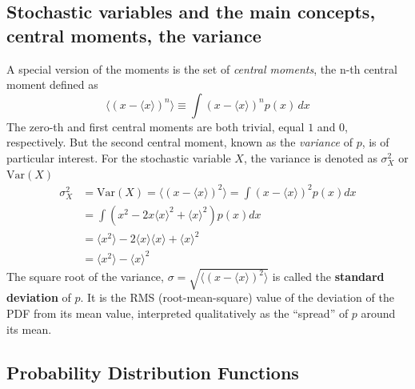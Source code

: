 \documentclass[%
oneside,                 %
final,                   %
10pt]{article}
\newenvironment{block_mdfboxadmon}[1][]{
\begin{block_mdfboxmdframed}[frametitle=#1]
}
{
\end{block_mdfboxmdframed}
}
\begin{document}
\subsection{Stochastic variables and the main concepts, central moments, the variance}

\begin{block_mdfboxadmon}[]

A special version of the moments is the set of \emph{central moments}, the n-th central moment defined as
\begin{equation*}
\langle (x-\langle x\rangle )^n\rangle  \equiv \int\! (x-\langle x\rangle)^n p(x)\,dx
\end{equation*}
The zero-th and first central moments are both trivial, equal $1$ and
$0$, respectively. But the second central moment, known as the
\emph{variance} of $p$, is of particular interest. For the stochastic
variable $X$, the variance is denoted as $\sigma^2_X$ or $\mathrm{Var}(X)$
\begin{align*}
\sigma^2_X &=\mathrm{Var}(X) =  \langle (x-\langle x\rangle)^2\rangle  =
\int (x-\langle x\rangle)^2 p(x)dx\\
& =  \int\left(x^2 - 2 x \langle x\rangle^{2} +\langle x\rangle^2\right)p(x)dx\\
& =  \langle x^2\rangle - 2 \langle x\rangle\langle x\rangle + \langle x\rangle^2\\
& =  \langle x^2 \rangle - \langle x\rangle^2
\end{align*}
The square root of the variance, $\sigma =\sqrt{\langle (x-\langle x\rangle)^2\rangle}$ is called the 
\textbf{standard deviation} of $p$. It is the RMS (root-mean-square)
value of the deviation of the PDF from its mean value, interpreted
qualitatively as the ``spread'' of $p$ around its mean.
\end{block_mdfboxadmon} %





\subsection{Probability Distribution Functions}
\end{document}
